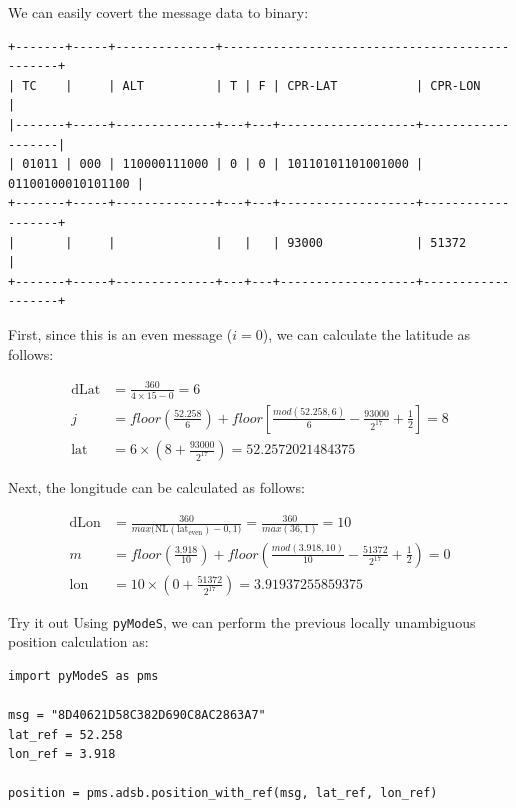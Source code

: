 We can easily covert the message data to binary:

\begin{verbatim}
+-------+-----+--------------+-----------------------------------------------+
| TC    |     | ALT          | T | F | CPR-LAT           | CPR-LON           |
|-------+-----+--------------+---+---+-------------------+-------------------|
| 01011 | 000 | 110000111000 | 0 | 0 | 10110101101001000 | 01100100010101100 |
+-------+-----+--------------+---+---+-------------------+-------------------+
|       |     |              |   |   | 93000             | 51372             |
+-------+-----+--------------+---+---+-------------------+-------------------+
\end{verbatim}

First, since this is an even message ($i=0$), we can calculate the latitude as follows:

\begin{align}
  \mathrm{dLat} &= \frac{360}{4 \times 15 - 0} = 6 \\
  j &= floor \left( \frac{52.258}{6} \right) + floor \left[ \frac{mod(52.258, 6)}{6} - \frac{93000}{2^{17}}  + \frac{1}{2} \right] = 8 \\
  \mathrm{lat} &= 6 \times \left( 8 + \frac{93000}{2^{17}} \right) = 52.2572021484375
\end{align}

Next, the longitude can be calculated as follows:

\begin{align}
  \mathrm{dLon} &= \frac{360}{max \Big( \mathrm{NL}(\mathrm{lat}_\mathrm{even})-0, 1 \Big)} = \frac{360}{max(36, 1)} = 10 \\
  m &= floor \left( \frac{3.918}{10} \right) + floor \left( \frac{mod(3.918, 10)}{10} - \frac{51372}{2^{17}}  + \frac{1}{2}  \right) = 0 \\
  \mathrm{lon} &= 10 \times \left(0 + \frac{51372}{2^{17}} \right) = 3.91937255859375
\end{align}

%

\begin{notebox}{Try it out}
Using \texttt{pyModeS}, we can perform the previous locally unambiguous position calculation as: 

\begin{verbatim}
import pyModeS as pms

msg = "8D40621D58C382D690C8AC2863A7"
lat_ref = 52.258
lon_ref = 3.918

position = pms.adsb.position_with_ref(msg, lat_ref, lon_ref)
\end{verbatim}

\end{notebox}


